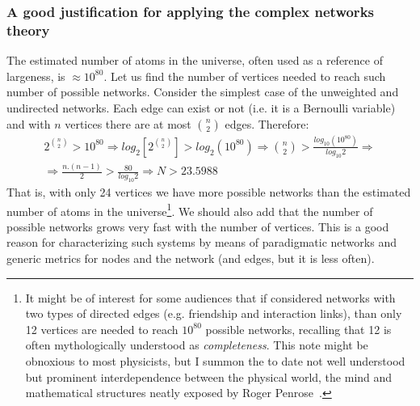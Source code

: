 \subsubsection{A good justification for applying the complex networks theory}
The estimated number of atoms in the universe, often used as a reference of largeness,
is $\approx 10^{80}$.
Let us find the number of vertices needed to reach such number of possible networks.
Consider the simplest case of the unweighted and undirected networks.
Each edge can exist or not (i.e. it is a Bernoulli variable) and with $n$ vertices there are
at most ${n \choose 2}$ edges.
Therefore:
\begin{align}
2^{n \choose 2} > 10^{80} \Rightarrow 
log_2[2^{n \choose 2}] > log_2(10^{80}) \Rightarrow
{n \choose 2} > \frac{log_{10}(10^{80})}{log_{10}2} \Rightarrow \nonumber\\
\Rightarrow \frac{n.(n-1)}{2} > \frac{80}{log_{10}2} \Rightarrow
N > 23.5988 \;\;\;\;\;\;\;\;\;\;\;\;\;\;\;\;\;\;\;\;\;
\end{align}
That is, with only 24 vertices we have more possible networks than
the estimated number of atoms in the universe\footnote{It might be of interest for some audiences that 
if considered networks with two types of directed edges (e.g. friendship and interaction links), than only
12 vertices are needed to reach $10^{80}$ possible networks, recalling that 12 is often mythologically understood as \emph{completeness}.
This note might be obnoxious to most physicists,
but I summon the to date not well understood but prominent interdependence between the physical world, the mind and mathematical structures
neatly exposed by Roger Penrose~\cite{penrose}.}.
We should also add that the number of possible networks grows
very fast with the number of vertices.
This is a good reason for characterizing such systems by means
of paradigmatic networks and generic metrics for nodes and the network (and edges, but it is less often).

